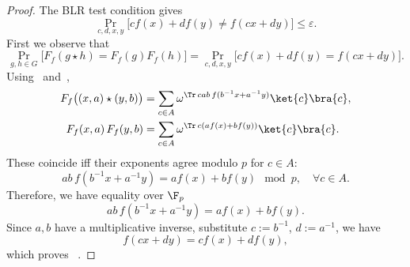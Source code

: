 \begin{proof}\leanok
The BLR test condition gives
\[
\Pr_{c,d,x,y}\!\bigl[c f(x) + d f(y) \neq f(cx + dy)\bigr] \leq \varepsilon.
\]
First we observe that
\begin{equation}\label{eq:rep-eq-blr}
\Pr_{g, h \in G}\!\bigl[F_f(g \star h) = F_f(g)F_f(h)\bigr]
= \Pr_{c,d,x,y}\!\bigl[c f(x) + d f(y) = f(cx + dy)\bigr].
\end{equation}
Using~ and~,
\begin{align*}
F_f\bigl((x,a)\star(y,b)\bigr) &= \sum_{c\in A}\omega^{\Tr\, cab\,f(b^{-1}x + a^{-1}y)} \ket{c}\bra{c}, \\
F_f(x, a)\,F_f(y, b) &= \sum_{c\in A} \omega^{\Tr\, c(af(x) + bf(y))} \ket{c}\bra{c}.
\end{align*}
These coincide iff their exponents agree modulo $p$ for $c \in A$: 
\[
ab\, f(b^{-1}x + a^{-1}y) = af(x) + bf(y) \mod p, \quad \forall c \in A.
\]
Therefore, we have equality over $\F_p$ 
\[
ab\, f(b^{-1}x + a^{-1}y) = af(x) + bf(y).
\]
Since $a, b$ have a multiplicative inverse, substitute $c := b^{-1}$, $d := a^{-1}$, we have
\[
f(cx + d y) = c f(x) + d f(y),
\]
which proves ~.


\end{proof}
